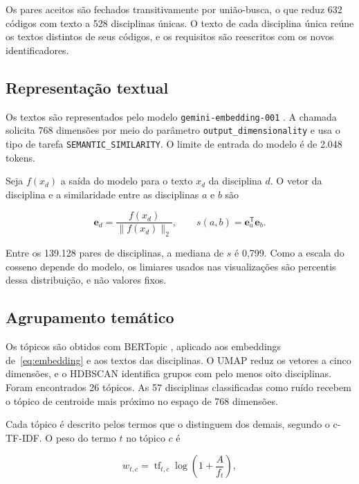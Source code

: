 \documentclass[
  12pt,
  oneside,
  a4paper,
  article,
  brazil
]{USPSC-classe/USPSC}
\begin{document}
Os pares aceitos são fechados transitivamente por união-busca, o que reduz 632
códigos com texto a 528 disciplinas únicas. O texto de cada disciplina única
reúne os textos distintos de seus códigos, e os requisitos são reescritos com os
novos identificadores.

\subsection{Representação textual}

Os textos são representados pelo modelo \texttt{gemini-embedding-001}
\cite{geminiembedding}. A chamada solicita 768 dimensões por meio do parâmetro
\texttt{output\_dimensionality} e usa o tipo de tarefa
\texttt{SEMANTIC\_SIMILARITY}. O limite de entrada do modelo é de 2.048 tokens.

Seja $f(x_d)$ a saída do modelo para o texto $x_d$ da disciplina $d$. O vetor da
disciplina e a similaridade entre as disciplinas $a$ e $b$ são

\begin{equation}
  \boldsymbol{e}_d=\frac{f(x_d)}{\lVert f(x_d)\rVert_2},
  \qquad
  s(a,b)=\boldsymbol{e}_a^{\mathsf T}\boldsymbol{e}_b.
  \label{eq:embedding}
\end{equation}

Entre os 139.128 pares de disciplinas, a mediana de $s$ é 0,799. Como a escala do
cosseno depende do modelo, os limiares usados nas visualizações são percentis
dessa distribuição, e não valores fixos.

\subsection{Agrupamento temático}

Os tópicos são obtidos com BERTopic \cite{grootendorst2022}, aplicado aos
embeddings de~\eqref{eq:embedding} e aos textos das disciplinas. O UMAP
\cite{mcinnes2018} reduz os vetores a cinco dimensões, e o HDBSCAN
\cite{mcinnes2017} identifica grupos com pelo menos oito disciplinas. Foram
encontrados 26 tópicos. As 57 disciplinas classificadas como ruído recebem o
tópico de centroide mais próximo no espaço de 768 dimensões.

Cada tópico é descrito pelos termos que o distinguem dos demais, segundo o
c-TF-IDF. O peso do termo $t$ no tópico $c$ é

\begin{equation}
  w_{t,c}=\operatorname{tf}_{t,c}
  \log\!\left(1+\frac{A}{f_t}\right),
  \label{eq:ctfidf}
\end{equation}
\end{document}

